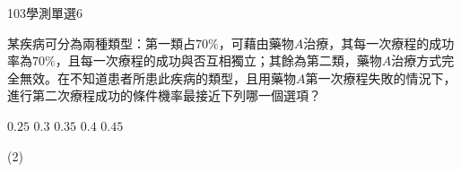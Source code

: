 \begin{QUESTIONS}
\begin{QUESTION}
\begin{QSOLLIST}
        \end{QSOLLIST}
        \begin{QEMPTYSPACE}
        \end{QEMPTYSPACE}
    \end{QUESTION}
    \begin{QUESTION}
        \begin{ExamInfo}{103}{學測}{單選}{6}
        \end{ExamInfo}
        \begin{ExamAnsRateInfo}{33}{55}{22}{22}
        \end{ExamAnsRateInfo}
        \begin{QBODY}
            某疾病可分為兩種類型：第一類占$70\%$，可藉由藥物$A$治療，其每一次療程的成功率為$70\%$，且每一次療程的成功與否互相獨立；其餘為第二類，藥物$A$治療方式完全無效。在不知道患者所患此疾病的類型，且用藥物$A$第一次療程失敗的情況下，進行第二次療程成功的條件機率最接近下列哪一個選項？
                \begin{QOPS}
    				\QOP $0.25$
    				\QOP $0.3$
    				\QOP $0.35$
    				\QOP $0.4$
    				\QOP $0.45$
                \end{QOPS}
        \end{QBODY}
        \begin{QFROMS}
        \end{QFROMS}
        \begin{QTAGS}\end{QTAGS}
        \begin{QANS}
            (2)
        \end{QANS}
        \begin{QSOLLIST}
        \end{QSOLLIST}
        \begin{QEMPTYSPACE}
        \end{QEMPTYSPACE}
    \end{QUESTION}
\end{QUESTIONS}
